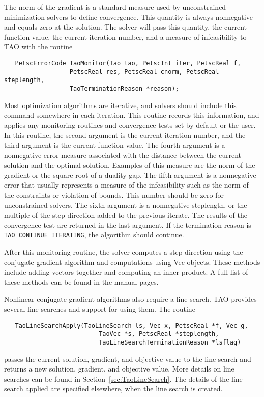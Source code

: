The norm of the gradient is a standard measure used
by unconstrained minimization solvers to define convergence.
This quantity is always nonnegative and equals zero at the solution.  
The solver will pass this quantity, the current
function value, the current iteration number, and a measure of
infeasibility to TAO with the routine
\begin{verbatim}
   PetscErrorCode TaoMonitor(Tao tao, PetscInt iter, PetscReal f,
                  PetscReal res, PetscReal cnorm, PetscReal steplength,
                  TaoTerminationReason *reason);
\end{verbatim}
Most optimization algorithms are iterative, and solvers should
include this command somewhere in each iteration.  This routine
records this information, and applies any monitoring routines and 
convergence tests set by default or the user.
In this routine, the second argument is the current
iteration number, and the third argument is the current function value.
The fourth argument is a nonnegative error measure associated with the
distance between the current solution and the optimal solution.  Examples
of this measure are the norm of the gradient or the square root of a duality 
gap. The fifth argument is a nonnegative error 
that usually
represents a measure of the infeasibility
such as the norm of the constraints or violation of bounds.
This number should be zero for unconstrained solvers.
The sixth argument is a nonnegative steplength, 
or the multiple of the step direction added to the previous iterate.
The results of the convergence test are returned in the last argument.
If the termination reason is {\tt TAO\_CONTINUE\_ITERATING}, the
algorithm should continue.

After this monitoring routine, the solver computes a step direction
using the conjugate gradient algorithm and computations using Vec objects.  
These methods include
adding vectors together and computing an inner product.  A full list
of these methods can be found in the manual pages.

Nonlinear conjugate gradient algorithms also require a line search.  TAO
provides several line searches and support for using them.
The routine
\begin{verbatim}
   TaoLineSearchApply(TaoLineSearch ls, Vec x, PetscReal *f, Vec g, 
                          TaoVec *s, PetscReal *steplength, 
                          TaoLineSearchTerminationReason *lsflag)
\end{verbatim}
passes the current solution, gradient, and objective value to the
line search and returns a new solution, gradient, and objective value.  More
details on line searches can be found in Section~\ref{sec:TaoLineSearch}.
The details of the line search applied are specified elsewhere, when
the line search is created.

